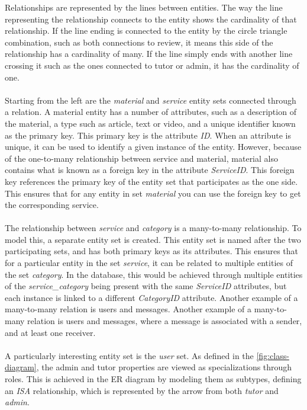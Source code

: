 Relationships are represented by the lines between entities.
The way the line representing the relationship connects to the entity shows the cardinality of that relationship.
If the line ending is connected to the entity by the circle triangle combination, such as both connections to review, it means this side of the relationship has a cardinality of many.
If the line simply ends with another line crossing it such as the ones connected to tutor or admin, it has the cardinality of one.
\\\\
Starting from the left are the \textit{material} and \textit{service} entity sets connected through a relation. 
A material entity has a number of attributes, such as a description of the material, a type such as article, text or video, and a unique identifier known as the primary key.
This primary key is the attribute \textit{ID}.
When an attribute is unique, it can be used to identify a given instance of the entity. 
However, because of the one-to-many relationship between service and material, material also contains what is known as a foreign key in the attribute \textit{ServiceID}.
This foreign key references the primary key of the entity set that participates as the one side. 
This ensures that for any entity in set \textit{material} you can use the foreign key to get the corresponding service.
\\\\
The relationship between \textit{service} and \textit{category} is a many-to-many relationship.
To model this, a separate entity set is created.
This entity set is named after the two participating sets, and has both primary keys as its attributes.
This ensures that for a particular entity in the set \textit{service}, it can be related to multiple entities of the set \textit{category}.
In the database, this would be achieved through multiple entities of the \textit{service\_category} being present with the same \textit{ServiceID} attributes, but each instance is linked to a different \textit{CategoryID} attribute.
Another example of a many-to-many relation is users and messages.
Another example of a many-to-many relation is users and messages, where a message is associated with a sender, and at least one receiver.
\\\\
A particularly interesting entity set is the \textit{user} set. 
As defined in the \autoref{fig:class-diagram}, the admin and tutor properties are viewed as specializations through roles.
This is achieved in the ER diagram by modeling them as subtypes, defining an \textit{ISA} relationship, which is represented by the arrow from both \textit{tutor} and \textit{admin}.
